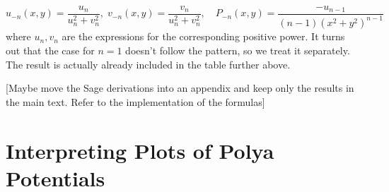 \documentclass[12pt]{article}
\begin{document}
\begin{equation}
\label{Eq:PolyaFieldNegativePowers}
\boxed
{		
u_{-n}(x,y) = \frac{u_n}{u_n^2 + v_n^2} ,\;
v_{-n}(x,y) = \frac{v_n}{u_n^2 + v_n^2} ,\quad
P_{-n}(x,y) = \frac{-u_{n-1}}{(n-1)(x^2+y^2)^{n-1}}
}
\end{equation}
where $u_n, v_n$ are the expressions for the corresponding positive power. It turns out that the case for $n=1$ doesn't follow the pattern, so we treat it separately. The result is actually already included in the table further above.

[Maybe move the Sage derivations into an appendix and keep only the results in the main text. Refer to the implementation of the formulas]

\section{Interpreting Plots of Polya Potentials}
\end{document}
